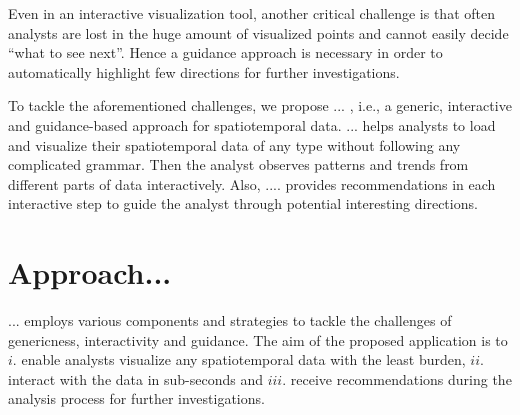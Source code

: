 \documentclass[runningheads,a4paper]{llncs}
\begin{document}
 Even in an interactive visualization tool, another critical challenge is that often analysts are lost in the huge amount of visualized points and cannot easily decide ``what to see next''. Hence a guidance approach is necessary in order to automatically highlight few directions for further investigations.

To tackle the aforementioned challenges, we propose ... , i.e., a generic, interactive and guidance-based approach for spatiotemporal data.  ...  helps analysts to load and visualize their spatiotemporal data of any type without following any complicated grammar. Then the analyst observes patterns and trends from different parts of data interactively. Also, ....  provides recommendations in each interactive step to guide the analyst through potential interesting directions.




\vspace{-5pt}
\section{Approach...}
... employs various components and strategies to tackle the challenges of genericness, interactivity and guidance. The aim of the proposed application is to $i.$ enable analysts visualize any spatiotemporal data with the least burden, $ii.$ interact with the data in sub-seconds and $iii.$ receive recommendations during the analysis process for further investigations.
\end{document}
